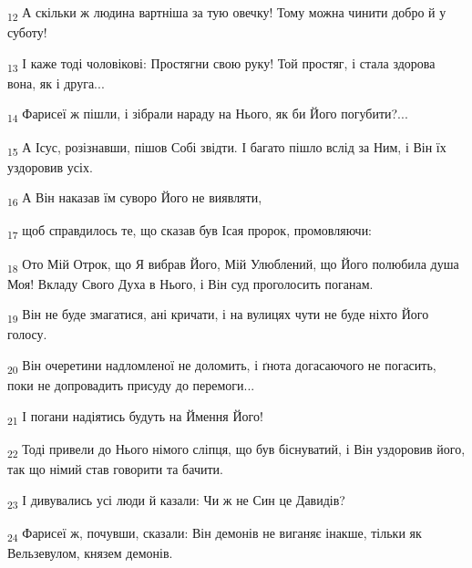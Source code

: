 \begin{tcolorbox}
\textsubscript{12} А скільки ж людина вартніша за тую овечку! Тому можна чинити добро й у суботу!
\end{tcolorbox}
\begin{tcolorbox}
\textsubscript{13} І каже тоді чоловікові: Простягни свою руку! Той простяг, і стала здорова вона, як і друга...
\end{tcolorbox}
\begin{tcolorbox}
\textsubscript{14} Фарисеї ж пішли, і зібрали нараду на Нього, як би Його погубити?...
\end{tcolorbox}
\begin{tcolorbox}
\textsubscript{15} А Ісус, розізнавши, пішов Собі звідти. І багато пішло вслід за Ним, і Він їх уздоровив усіх.
\end{tcolorbox}
\begin{tcolorbox}
\textsubscript{16} А Він наказав їм суворо Його не виявляти,
\end{tcolorbox}
\begin{tcolorbox}
\textsubscript{17} щоб справдилось те, що сказав був Ісая пророк, промовляючи:
\end{tcolorbox}
\begin{tcolorbox}
\textsubscript{18} Ото Мій Отрок, що Я вибрав Його, Мій Улюблений, що Його полюбила душа Моя! Вкладу Свого Духа в Нього, і Він суд проголосить поганам.
\end{tcolorbox}
\begin{tcolorbox}
\textsubscript{19} Він не буде змагатися, ані кричати, і на вулицях чути не буде ніхто Його голосу.
\end{tcolorbox}
\begin{tcolorbox}
\textsubscript{20} Він очеретини надломленої не доломить, і ґнота догасаючого не погасить, поки не допровадить присуду до перемоги...
\end{tcolorbox}
\begin{tcolorbox}
\textsubscript{21} І погани надіятись будуть на Ймення Його!
\end{tcolorbox}
\begin{tcolorbox}
\textsubscript{22} Тоді привели до Нього німого сліпця, що був біснуватий, і Він уздоровив його, так що німий став говорити та бачити.
\end{tcolorbox}
\begin{tcolorbox}
\textsubscript{23} І дивувались усі люди й казали: Чи ж не Син це Давидів?
\end{tcolorbox}
\begin{tcolorbox}
\textsubscript{24} Фарисеї ж, почувши, сказали: Він демонів не виганяє інакше, тільки як Вельзевулом, князем демонів.
\end{tcolorbox}
